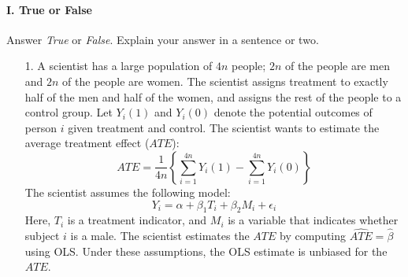 \documentclass{article}
\newcommand{\E}[0]{\mathbb{E}}
\begin{document}
\paragraph{\Large I. True or False}
Answer {\em True} or {\em False}.  Explain your answer in a sentence or two.
\begin{itemize}


\item[1.]   
      A scientist has a large population of $4n$ people;
      $2n$ of the people are men and $2n$ of the people are women.
      The scientist assigns treatment to exactly half of the men and half of the women,
      and assigns the rest of the people to a control group.
      Let $Y_i(1)$ and $Y_i(0)$ denote the potential outcomes
      of person $i$ given treatment and control.
      The scientist wants to estimate the average treatment effect ($ATE$):
      $$
        ATE = \frac{1}{4n}\left\{\sum_{i=1}^{4n}Y_i(1) - \sum_{i=1}^{4n} Y_i(0)\right\}
      $$
      The scientist assumes the following model:
      $$
        Y_i = \alpha + \beta_1 T_i + \beta_2 M_i + \epsilon_i
      $$
      Here, $T_i$ is a treatment indicator, and
      $M_i$ is a variable that indicates whether
      subject $i$ is a male.
      The scientist estimates the $ATE$ by computing $\widehat{ATE} = \hat\beta$ 
      using OLS. 
      Under these assumptions, the OLS estimate is unbiased for the $ATE$.



\end{itemize}
\end{document}
